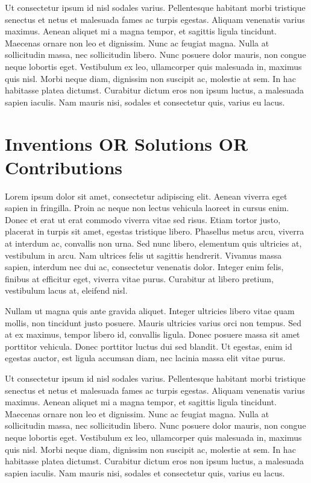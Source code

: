 Ut consectetur ipsum id nisl sodales varius. Pellentesque habitant morbi tristique senectus et netus et malesuada fames ac turpis egestas. Aliquam venenatis varius maximus. Aenean aliquet mi a magna tempor, et sagittis ligula tincidunt. Maecenas ornare non leo et dignissim. Nunc ac feugiat magna. Nulla at sollicitudin massa, nec sollicitudin libero. Nunc posuere dolor mauris, non congue neque lobortis eget. Vestibulum ex leo, ullamcorper quis malesuada in, maximus quis nisl. Morbi neque diam, dignissim non suscipit ac, molestie at sem. In hac habitasse platea dictumst. Curabitur dictum eros non ipsum luctus, a malesuada sapien iaculis. Nam mauris nisi, sodales et consectetur quis, varius eu lacus.

\section{Inventions OR Solutions OR Contributions}

Lorem ipsum dolor sit amet, consectetur adipiscing elit. Aenean viverra eget sapien in fringilla. Proin ac neque non lectus vehicula laoreet in cursus enim. Donec et erat ut erat commodo viverra vitae sed risus. Etiam tortor justo, placerat in turpis sit amet, egestas tristique libero. Phasellus metus arcu, viverra at interdum ac, convallis non urna. Sed nunc libero, elementum quis ultricies at, vestibulum in arcu. Nam ultrices felis ut sagittis hendrerit. Vivamus massa sapien, interdum nec dui ac, consectetur venenatis dolor. Integer enim felis, finibus at efficitur eget, viverra vitae purus. Curabitur at libero pretium, vestibulum lacus at, eleifend nisl.

Nullam ut magna quis ante gravida aliquet. Integer ultricies libero vitae quam mollis, non tincidunt justo posuere. Mauris ultricies varius orci non tempus. Sed at ex maximus, tempor libero id, convallis ligula. Donec posuere massa sit amet porttitor vehicula. Donec porttitor luctus dui sed blandit. Ut egestas, enim id egestas auctor, est ligula accumsan diam, nec lacinia massa elit vitae purus.

Ut consectetur ipsum id nisl sodales varius. Pellentesque habitant morbi tristique senectus et netus et malesuada fames ac turpis egestas. Aliquam venenatis varius maximus. Aenean aliquet mi a magna tempor, et sagittis ligula tincidunt. Maecenas ornare non leo et dignissim. Nunc ac feugiat magna. Nulla at sollicitudin massa, nec sollicitudin libero. Nunc posuere dolor mauris, non congue neque lobortis eget. Vestibulum ex leo, ullamcorper quis malesuada in, maximus quis nisl. Morbi neque diam, dignissim non suscipit ac, molestie at sem. In hac habitasse platea dictumst. Curabitur dictum eros non ipsum luctus, a malesuada sapien iaculis. Nam mauris nisi, sodales et consectetur quis, varius eu lacus.


